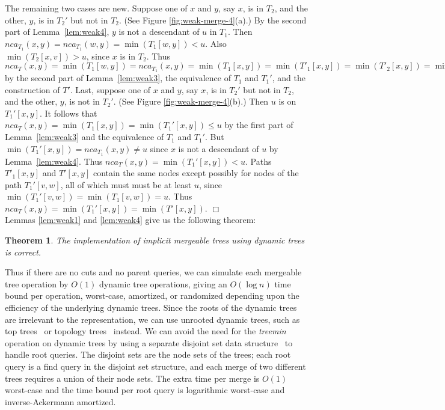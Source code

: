 \documentclass[twoside,leqno,twocolumn]{article}
\newtheorem{theorem}{Theorem}
\newcommand{\proofend}{$\Box$\\}
\newcommand{\nca}{\mathit{nca}}
\begin{document}
The remaining two cases are new.  Suppose one of $x$ and $y$, say $x$, is in $T_2$, and the other, $y$, is in $T_2'$ but not in $T_2$.
(See Figure \ref{fig:weak-merge-4}(a).) By the second part of Lemma~\ref{lem:weak4}, $y$ is not a descendant of $u$ in $T_1$.  Then $\nca_{T_1}(x, y) = \nca_{T_1}(w, y) = \min(T_1[w, y]) < u$. Also $\min(T_2[x, v]) > u$, since $x$ is in $T_2$.  Thus $\nca_{T}(x, y) = \min(T_1[w, y]) = \nca_{T_1}(x, y) = \min(T_1[x, y]) = \min(T'_1[x, y]) = \min(T'_2[x, y]) = \min(T'[x, y])$ by the second part of
Lemma~\ref{lem:weak3}, the equivalence of $T_1$ and $T_1'$, and the construction of $T'$.  Last, suppose one of $x$ and $y$, say $x$,
is in $T_2'$ but not in $T_2$, and the other, $y$, is not in $T_2'$. (See Figure \ref{fig:weak-merge-4}(b).) Then $u$ is on $T_1'[x,y]$.
It follows that $\nca_T(x, y) = \min(T_1[x, y]) = \min(T_1'[x, y]) \leq u$ by the first part of Lemma~\ref{lem:weak3} and the equivalence of $T_1$ and $T_1'$.  But $\min(T_1'[x, y]) = \nca_{T_1}(x, y) \neq u$ since $x$ is not a descendant of $u$ by Lemma~\ref{lem:weak4}.  Thus $\nca_T(x, y) = \min(T_1'[x, y]) < u$.  Paths $T'_1[x,y]$ and $T'[x,y]$ contain the same nodes except possibly for nodes of the path $T_1'[v,w]$, all of which must must be at least $u$, since $\min(T_1'[v, w]) = \min(T_1[v, w]) = u$. Thus $\nca_T(x, y) = \min(T_1'[x, y]) = \min(T'[x, y])$.
\proofend

Lemmas \ref{lem:weak1} and \ref{lem:weak4} give us the following theorem:
\begin{theorem}
\label{theorem:implicit} The implementation of implicit mergeable trees using dynamic trees is correct.
\end{theorem}
Thus if there are no cuts and no parent queries, we can simulate each mergeable tree operation by $O(1)$ dynamic tree operations, giving an $O(\log n)$ time bound per operation, worst-case, amortized, or randomized depending upon the efficiency of the underlying dynamic trees.  Since the roots of the dynamic trees are irrelevant to the representation, we can use unrooted dynamic trees, such as top trees~\cite{AHTdL05} or topology trees~\cite{Fre97a} instead.  We can avoid the need for the \emph{treemin} operation on dynamic trees by using a separate disjoint set data structure~\cite{Tar75,Smi90} to handle root queries.  The disjoint sets are the node sets of the trees; each root query is a find query in the disjoint set structure, and each merge of two different trees requires a union of their node sets.  The extra time per merge is $O(1)$ worst-case and the time bound per root query is logarithmic worst-case and inverse-Ackermann amortized.
\end{document}
